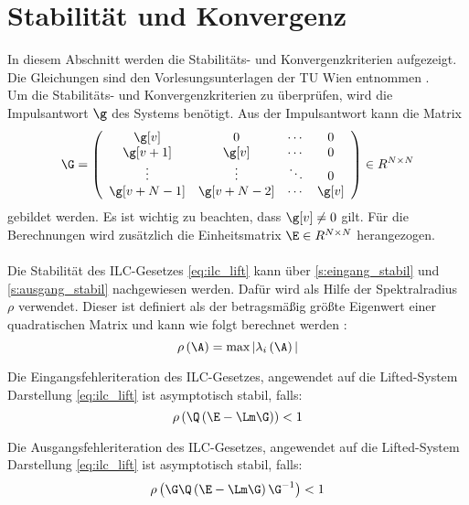 \section{Stabilität und Konvergenz}
In diesem Abschnitt werden die Stabilitäts- und Konvergenzkriterien aufgezeigt. Die Gleichungen sind den Vorlesungsunterlagen der TU Wien entnommen \cite{UniWien}. \\
Um die Stabilitäts- und Konvergenzkriterien zu überprüfen, wird die Impulsantwort $\g$ des Systems benötigt. Aus der Impulsantwort kann die Matrix  
\begin{equation}
	\label{eq:G}
	\G = \left( \begin{array}{cccc}
		\g[v] & 0 &  \cdots & 0 \\
		\g[v+1] & \g[v] &  \cdots & 0 \\
		\vdots & \vdots & \ddots & 0 \\
		\g[v+N-1] & \g[v+N-2] & \cdots & \g[v] \\
	\end{array}\right) \in R^{N \times N}
\end{equation}
gebildet werden. Es ist wichtig zu beachten, dass $\g[v] \neq 0$ gilt. Für die Berechnungen wird zusätzlich die Einheitsmatrix $\E \in R^{N \times N}$ herangezogen. \\
\\
Die Stabilität des ILC-Gesetzes \autoref{eq:ilc_lift} kann über \autoref{s:eingang_stabil} und \autoref{s:ausgang_stabil} nachgewiesen werden. Dafür wird als Hilfe der Spektralradius $\rho$ verwendet. Dieser ist definiert als der betragsmäßig größte Eigenwert einer quadratischen Matrix und kann wie folgt berechnet werden \cite{spektralradius}:
\begin{equation}
	\label{eq:spektralradius}
	\rho\left(\A\right) = \text{max} \, |\lambda_i\left(\A\right)|
\end{equation}
\begin{satz}
	\label{s:eingang_stabil}
	Die Eingangsfehleriteration des ILC-Gesetzes, angewendet auf die Lifted-System Darstellung \ref{eq:ilc_lift} ist asymptotisch stabil, falls:
	\begin{equation}
		\label{eq:eingang_stabil}
		\rho\left(\Q\left(\E-\Lm\G\right)\right) < 1
	\end{equation}
\end{satz}
\begin{satz}
	\label{s:ausgang_stabil}
	Die Ausgangsfehleriteration des ILC-Gesetzes, angewendet auf die Lifted-System Darstellung \ref{eq:ilc_lift} ist asymptotisch stabil, falls:
	\begin{equation}
		\label{eq:ausgang_stabil}
		\rho\left(\G\Q\left(\E-\Lm\G\right)\G^{-1}\right) < 1
	\end{equation}
\end{satz}
